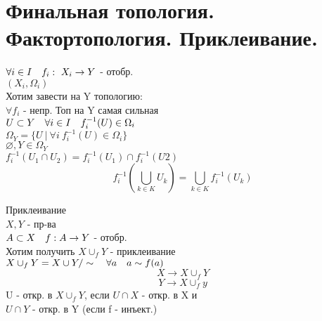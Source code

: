 \documentclass[geometry.tex]{subfiles}
\begin{document}
  \section{Финальная топология. Фактортопология. Приклеивание.}

  \begin{definition}
      $\forall i \in I \quad f_i: \ X_i \rightarrow Y$ - отобр.\\
      $(X_i, \Omega_i)$\\
      Хотим завести на Y топологию:\\
      $\forall f_i$ - непр. Топ на Y самая сильная \\
      $U \subset Y \quad \forall i \in I \quad f_i^{-1}(U) \in \Omega_i$\\
      $\Omega_Y = \{U \ | \ \forall i \ f_i^{-1}(U) \in \Omega_i\}$\\
      $\varnothing, Y \in \Omega_Y$\\
      $f_i^{-1}(U_1 \cap U_2) = f_i^{-1}(U_1) \cap f_i^{-1}(U2)$\\
      \[f_i^{-1}(\bigcup_{k \in K} U_k) = \bigcup_{k \in K} f_i^{-1}(U_k)\]
  \end{definition}

  \begin{example}
      Приклеивание\\
      $X, Y$ - пр-ва\\
      $A \subset X \quad f: A \rightarrow Y$ - отобр.\\
      Хотим получить $X \cup_f Y$ - приклеивание\\
      $X \cup_f Y = X \cup Y /\sim \quad \forall a \quad a \sim f(a)$\\
      \[X \to X \cup_f Y\]
      \[Y \to X \cup_f y\]
      U - откр. в $X \cup_f Y$, если $U \cap X$ - откр. в X и\\ $U \cap Y$ - откр. в Y
      (если f - инъект.)
  \end{example}
\end{document}
